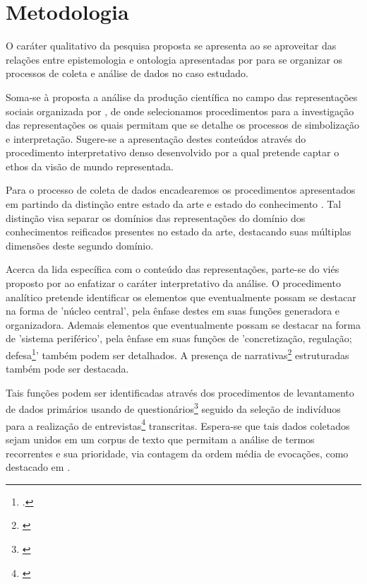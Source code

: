 \documentclass[
   article,       %
   12pt,          %
   oneside,       %
   a4paper,       %
   english,       %
   brazil,           %
   sumario=tradicional
   ]{abntex2}
\begin{document}
\section{Metodologia}

O caráter qualitativo da pesquisa proposta se apresenta ao se aproveitar das relações entre epistemologia e ontologia apresentadas por \cite{ontologia_epistemologia} para se organizar os processos de coleta e análise de dados no caso estudado.

Soma-se à proposta a análise da produção científica no campo das representações sociais organizada por \cite[p.9]{Representacoes_Jodelet}, de onde selecionamos procedimentos para a investigação das representações os quais permitam que se detalhe os processos de simbolização e interpretação. Sugere-se a apresentação destes conteúdos através do procedimento interpretativo denso desenvolvido por \cite[p.93]{Culturas_Geertz} a qual pretende captar o ethos da visão de mundo representada.

Para o processo de coleta de dados encadearemos os procedimentos apresentados em \cite{Metodologia-Pesquisa} partindo da distinção entre estado da arte e estado do conhecimento \cite{estado_arte_conhecimento}. Tal distinção visa separar os domínios das representações do domínio dos conhecimentos reificados presentes no estado da arte, destacando suas múltiplas dimensões deste segundo domínio.

Acerca da lida específica com o conteúdo das representações, parte-se do viés proposto por \cite[p.130]{representacoes_metodologia} ao enfatizar o caráter interpretativo da análise. O procedimento analítico pretende identificar os elementos que eventualmente possam se destacar na forma de 'núcleo central', pela ênfase destes em suas funções generadora e organizadora. Ademais elementos que eventualmente possam se destacar na forma de 'sistema periférico', pela ênfase em suas funções de 'concretização, regulação; defesa\footnote{\cite[p.132]{representacoes_metodologia}.}' também podem ser detalhados. A presença de narrativas\footnote{\cite{narrativas}} estruturadas também pode ser destacada.

Tais funções podem ser identificadas através dos procedimentos de levantamento de dados primários usando de questionários\footnote{\cite[p.237]{QUESTIONaRIO_epistemologia}} seguido da seleção de indivíduos para a realização de entrevistas\footnote{\cite[p.228]{QUESTIONaRIO_epistemologia}} transcritas. Espera-se que tais dados coletados sejam unidos em um corpus de texto que permitam a análise de termos recorrentes e sua prioridade, via contagem da ordem média de evocações, como destacado em \cite[p.137]{representacoes_metodologia}. 
\end{document}
